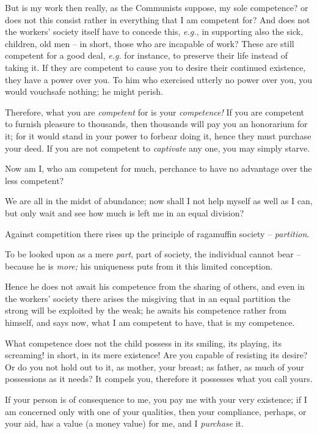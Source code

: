 But is my work then really, as the Communists suppose, my sole competence? or 
does not this consist rather in everything that I am competent for? And does 
not the workers' society itself have to concede this, \textit{e.g.,} in 
supporting also the sick, children, old men -- in short, those who are 
incapable of work? These are still competent for a good deal, \textit{e.g.} 
for instance, to preserve their life instead of taking it. If they are 
competent to cause you to desire their continued existence, they have a power 
over you. To him who exercised utterly no power over you, you would vouchsafe 
nothing; he might perish.

Therefore, what you are \textit{competent} for is your \textit{competence!} If 
you are competent to furnish pleasure to thousands, then thousands will pay 
you an honorarium for it; for it would stand in your power to forbear doing 
it, hence they must purchase your deed. If you are not competent to 
\textit{captivate} any one, you may simply starve.

Now am I, who am competent for much, perchance to have no advantage over the 
less competent?

We are all in the midst of abundance; now shall I not help myself as well as I 
can, but only wait and see how much is left me in an equal division?

Against competition there rises up the principle of ragamuffin society -- 
\textit{partition}.

To be looked upon as a mere \textit{part}, part of society, the individual 
cannot bear -- because he is \textit{more;} his uniqueness puts from it this 
limited conception.

Hence he does not await his competence from the sharing of others, and even in 
the workers' society there arises the misgiving that in an equal partition the 
strong will be exploited by the weak; he awaits his competence rather from 
himself, and says now, what I am competent to have, that is my competence.

What competence does not the child possess in its smiling, its playing, its 
screaming! in short, in its mere existence! Are you capable of resisting its 
desire? Or do you not hold out to it, as mother, your breast; as father, as 
much of your possessions as it needs? It compels you, therefore it possesses 
what you call yours.

If your person is of consequence to me, you pay me with your very existence; 
if I am concerned only with one of your qualities, then your compliance, 
perhaps, or your aid, has a value (a money value) for me, and I 
\textit{purchase} it.

